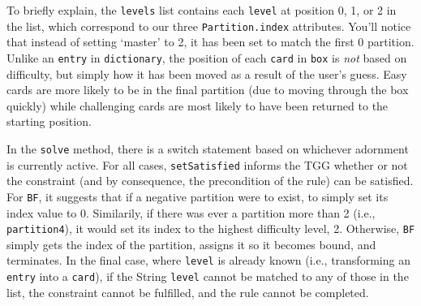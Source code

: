 To briefly explain, the \texttt{levels} list contains each \texttt{level} at position 0, 1, or 2 in the list, which correspond to our three
\texttt{Partition.index} attributes. You'll notice that instead of setting `master' to 2, it has been set to match the first 0 partition. Unlike an
\texttt{entry} in \texttt{dictionary}, the position of each \texttt{card} in \texttt{box} is \emph{not} based on difficulty, but simply how it has been moved
as a result of the user's guess. Easy cards are more likely to be in the final partition (due to moving through the box quickly) while challenging cards are
most likely to have been returned to the starting position.

In the \texttt{solve} method, there is a switch statement based on whichever adornment is currently active. For all cases, \texttt{setSatisfied}
informs the TGG whether or not the constraint (and by consequence, the precondition of the rule) can be satisfied. For \texttt{BF}, it suggests that if a
negative partition were to exist, to simply set its index value to 0. Similarily, if there was ever a partition more than 2 (i.e., \texttt{partition4}), it
would set its index to the highest difficulty level, 2. Otherwise, \texttt{BF} simply gets the index of the partition, assigns it so it becomes bound, and
terminates. In the final case, where \texttt{level} is already known (i.e., transforming an \texttt{entry} into a \texttt{card}), if the String \texttt{level}
cannot be matched to any of those in the list, the constraint cannot be fulfilled, and the rule cannot be completed.
